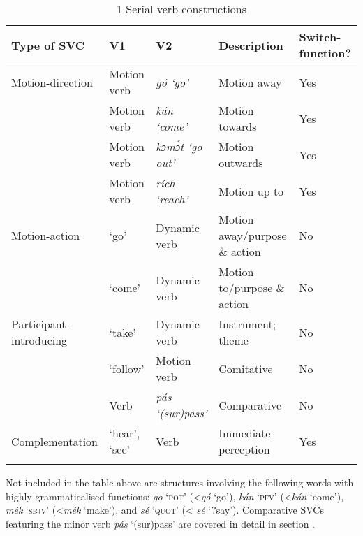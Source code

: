 \begin{table}
\caption{1 Serial verb constructions}
\label{tab:key:11.1}
\small
\begin{tabularx}{\textwidth}{lp{1.8cm}lQQ}
\lsptoprule

Type of SVC & V1 & V2 & Description & Switch-function?\\
\midrule
Motion-direction & Motion verb & \itshape gó \textup{‘go’} & Motion away & Yes\\
& Motion verb & \itshape kán \textup{‘come’} & Motion towards & Yes\\
& Motion verb & \itshape kɔmɔ́t \textup{‘go out’} & Motion outwards & Yes\\
& Motion verb & \itshape rích \textup{‘reach’} & Motion up to & Yes\\

\tablevspace
Motion-action &  ‘go’ & Dynamic verb & Motion away/purpose \& action & No\\
&  ‘come’ & Dynamic verb & Motion to/purpose \& action & No\\

\tablevspace
Participant-introducing  &  ‘take’ & Dynamic verb & Instrument; theme\index{} & No\\
&  ‘follow’ & Motion verb & Comitative  & No\\
& Verb & \itshape pás \textup{‘(sur)pass’} & Comparative & No\\


\tablevspace
Complementation &  ‘hear’,\newline  {} ‘see’ & Verb & Immediate perception & Yes\\
\lspbottomrule
\end{tabularx}
\end{table}
Not included in the table above are structures involving the following words with highly grammaticalised functions: \textit{go} \textsc{‘pot’} (<\textit{gó} ‘go’), \textit{kán} \textsc{‘pfv’} (<\textit{kán} ‘come’), \textit{mék} \textsc{‘sbjv’} (<\textit{mék} ‘make’), and \textit{sé} \textsc{‘quot’} (< \textit{sé} ‘?say’). Comparative SVCs featuring the minor verb \textit{pás} ‘(sur)pass’ are covered in detail in section .


